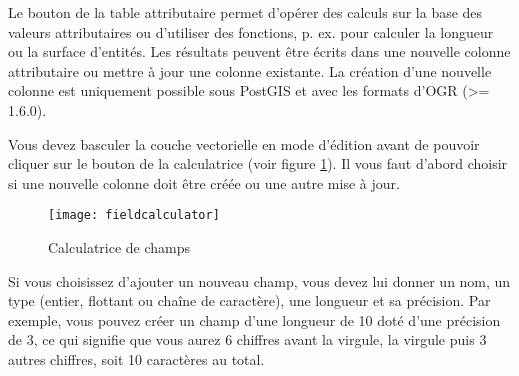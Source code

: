 Le bouton  de la table 
attributaire permet d'opérer des calculs sur la base des valeurs attributaires 
ou d'utiliser des fonctions, p. ex. pour calculer la longueur ou la surface 
d'entités. Les résultats peuvent être écrits dans une nouvelle colonne attributaire 
ou mettre à jour une colonne existante. La création d'une nouvelle colonne est 
uniquement possible sous PostGIS et avec les formats d'OGR (>= 1.6.0).

Vous devez basculer la couche vectorielle en mode d'édition avant de pouvoir 
cliquer sur le bouton de la calculatrice (voir figure \ref{fig:field_calculator}). 
Il vous faut d'abord choisir si une nouvelle colonne doit être créée ou une 
autre mise à jour.

\begin{figure}[ht]
  \centering
    \texttt{[image: fieldcalculator]}
    \caption{Calculatrice de champs \nixcaption}\label{fig:field_calculator}
\end{figure}

Si vous choisissez d'ajouter un nouveau champ, vous devez lui donner un nom, un 
type (entier, flottant ou chaîne de caractère), une longueur et sa précision. Par 
exemple, vous pouvez créer un champ d'une longueur de 10 doté d'une précision 
de 3, ce qui signifie que vous aurez 6 chiffres avant la virgule, la virgule puis 
3 autres chiffres, soit 10 caractères au total.

